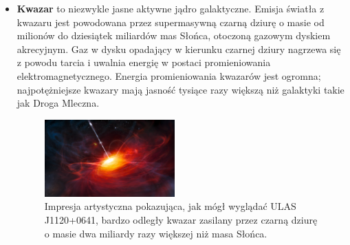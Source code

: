 \documentclass[conference]{IEEEtran}
\begin{document}
\begin{itemize}
    \item \textbf{Kwazar} to niezwykle jasne aktywne jądro galaktyczne. Emisja światła z kwazaru jest powodowana przez supermasywną czarną dziurę o masie od milionów do dziesiątek miliardów mas Słońca, otoczoną gazowym dyskiem akrecyjnym. Gaz w dysku opadający w kierunku czarnej dziury nagrzewa się z powodu tarcia i uwalnia energię w postaci promieniowania elektromagnetycznego. Energia promieniowania kwazarów jest ogromna; najpotężniejsze kwazary mają jasność tysiące razy większą niż galaktyki takie jak Droga Mleczna.
    \begin{figure}[ht]
        \centering
        \includegraphics[width = 5cm]{figures/quazar.jpg}
        \caption{Impresja artystyczna pokazująca, jak mógł wyglądać ULAS J1120+0641, bardzo odległy kwazar zasilany przez czarną dziurę o masie dwa miliardy razy większej niż masa Słońca.\cite{quasar}}
    \end{figure}
\end{itemize}
\end{document}
